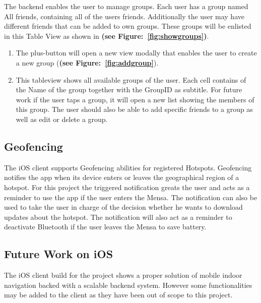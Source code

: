 The backend enables the user to manage groups. Each user has a group named All friends, containing all of the users friends. Additionally the user may have different friends that can be added to own groups. These groups will be enlisted in this Table View as shown in \textbf{(see Figure:~\ref{fig:showgroups})}.

\begin{enumerate}
 \item The plus-button will open a new view modally that enables the user to create a new group (\textbf{(see Figure:~\ref{fig:addgroup}}).
 \item This tableview shows all available groups of the user. Each cell contains of the Name of the group together with the GroupID as subtitle. For future work if the user taps a group, it will open a new list showing the members of this group. The user should also be able to add specific friends to a group as well as edit or delete a group.
\end{enumerate}

\subsection{Geofencing}
The iOS client supports Geofencing abilities for registered Hotspots. Geofencing notifies the app when its device enters or leaves the geographical region of a hotspot. For this project the triggered notification greats the user and acts as a reminder to use the app if the user enters the Mensa. The notification can also be used to take the user in charge of the decision whether he wants to download updates about the hotspot. The notification will also act as a reminder to deactivate Bluetooth if the user leaves the Mensa to save battery.


\subsection{Future Work on iOS}
The iOS client build for the project shows a proper solution of mobile indoor navigation backed with a scalable backend system. However some functionalities may be added to the client as they have been out of scope to this project.

